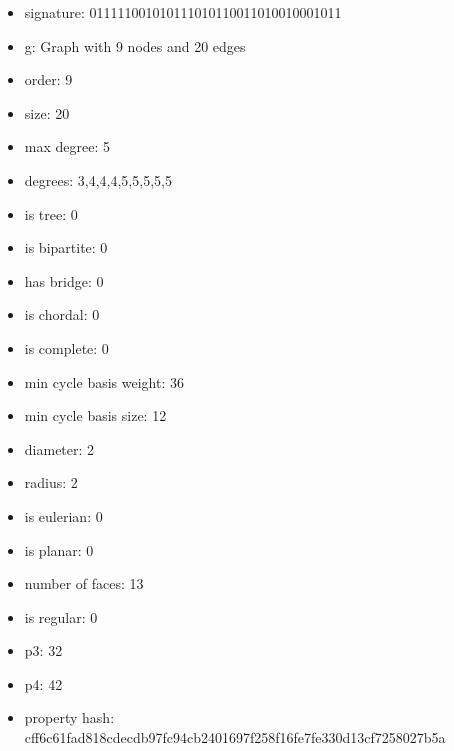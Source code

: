 \newpage
\begin{figure}
\end{figure}
\begin{itemize}
\item signature: 011111001010111010110011010010001011
\item g: Graph with 9 nodes and 20 edges
\item order: 9
\item size: 20
\item max degree: 5
\item degrees: 3,4,4,4,5,5,5,5,5
\item is tree: 0
\item is bipartite: 0
\item has bridge: 0
\item is chordal: 0
\item is complete: 0
\item min cycle basis weight: 36
\item min cycle basis size: 12
\item diameter: 2
\item radius: 2
\item is eulerian: 0
\item is planar: 0
\item number of faces: 13
\item is regular: 0
\item p3: 32
\item p4: 42
\item property hash: cff6c61fad818cdecdb97fc94cb2401697f258f16fe7fe330d13cf7258027b5a
\end{itemize}
